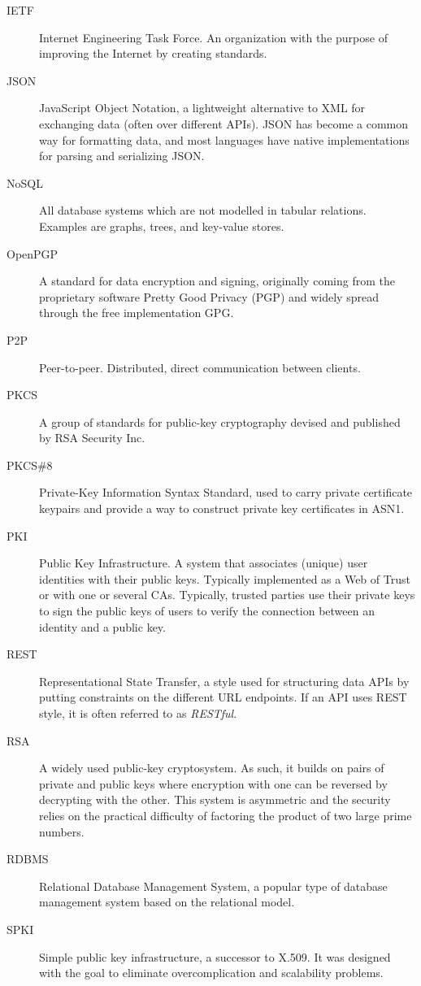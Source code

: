 \begin{description}
  \item[IETF] Internet Engineering Task Force. An organization with the purpose of improving the Internet by creating standards. 
  \item[JSON] JavaScript Object Notation, a lightweight alternative to XML for exchanging data (often over different APIs). JSON has become a common way for formatting data, and most languages have native implementations for parsing and serializing JSON.
  \item[NoSQL] All database systems which are not modelled in tabular relations. Examples are graphs, trees, and key-value stores.
  \item[OpenPGP] A standard for data encryption and signing, originally coming from the proprietary software Pretty Good Privacy (PGP) and widely spread through the free implementation GPG.
  \item[P2P] Peer-to-peer. Distributed, direct communication between clients.
  \item[PKCS] A group of standards for public-key cryptography devised and published by RSA Security Inc.
  \item[PKCS\#8] Private-Key Information Syntax Standard, used to carry private certificate keypairs and provide a way to construct private key certificates in ASN1.
  \item[PKI] Public Key Infrastructure. A system that associates (unique) user identities with their public keys. Typically implemented as a Web of Trust or with one or several CAs. Typically, trusted parties use their private keys to sign the public keys of users to verify the connection between an identity and a public key.
  \item[REST] Representational State Transfer, a style used for structuring data APIs by putting constraints on the different URL endpoints. If an API uses REST style, it is often referred to as \emph{RESTful}.
  \item[RSA] A widely used public-key cryptosystem. As such, it builds on pairs of private and public keys where encryption with one can be reversed by decrypting with the other. This system is asymmetric and the security relies on the practical difficulty of factoring the product of two large prime numbers.
  \item[RDBMS] Relational Database Management System, a popular type of database management system based on the relational model.
  \item[SPKI] Simple public key infrastructure, a successor to X.509. It was designed with the goal to eliminate overcomplication and scalability problems.

\end{description}
